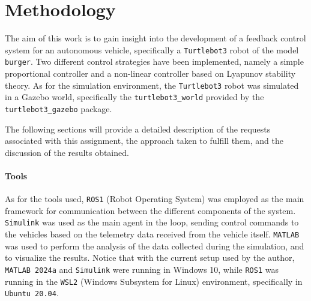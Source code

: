 \section{Methodology}
\label{sec:methodology}

The aim of this work is to gain insight into the development of a feedback control system for an autonomous vehicle, specifically a \texttt{Turtlebot3} robot of the model \texttt{burger}.
Two different control strategies have been implemented, namely a simple proportional controller and a non-linear controller based on Lyapunov stability theory.
As for the simulation environment, the \texttt{Turtlebot3} robot was simulated in a Gazebo world, specifically the \texttt{turtlebot3\_world} provided by the \texttt{turtlebot3\_gazebo} package.

The following sections will provide a detailed description of the requests associated with this assignment, the approach taken to fulfill them, and the discussion of the results obtained.

\paragraph{Tools}

As for the tools used, \texttt{ROS1} (Robot Operating System) was employed as the main framework for communication between the different components of the system.
\texttt{Simulink} was used as the main agent in the loop, sending control commands to the vehicles based on the telemetry data received from the vehicle itself.
\texttt{MATLAB} was used to perform the analysis of the data collected during the simulation, and to visualize the results.
Notice that with the current setup used by the author, \texttt{MATLAB 2024a} and \texttt{Simulink} were running in Windows 10, while \texttt{ROS1} was running in the \texttt{WSL2} (Windows Subsystem for Linux) environment, specifically in \texttt{Ubuntu 20.04}.
